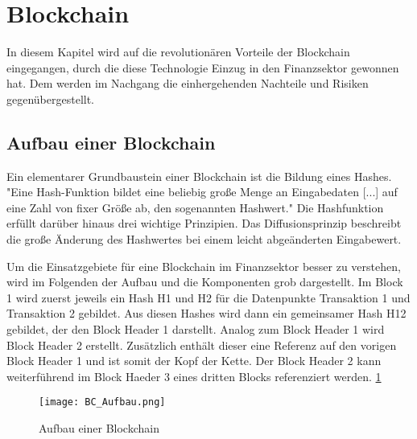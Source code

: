 \section{Blockchain}
In diesem Kapitel wird auf die revolutionären Vorteile der Blockchain 
eingegangen, durch die diese Technologie Einzug in den Finanzsektor gewonnen 
hat. Dem werden im Nachgang die einhergehenden Nachteile und Risiken gegenübergestellt. 

\subsection{Aufbau einer Blockchain}
Ein elementarer Grundbaustein einer Blockchain ist die Bildung eines Hashes.
"Eine Hash-Funktion bildet eine beliebig große Menge an Eingabedaten [...] auf eine Zahl von 
fixer Größe ab, den sogenannten Hashwert." \cite[p.~6]{fill2020aufbau}
Die Hashfunktion erfüllt darüber hinaus drei wichtige Prinzipien.
Das Diffusionsprinzip beschreibt die große Änderung des Hashwertes bei einem leicht
abgeänderten Eingabewert.
\cite[p.~6ff]{fill2020aufbau}

Um die Einsatzgebiete für eine Blockchain im Finanzsektor besser zu verstehen,
wird im Folgenden der Aufbau und die Komponenten grob dargestellt.
Im Block 1 wird zuerst jeweils ein Hash H1 und H2 für die Datenpunkte Transaktion 1 
und Transaktion 2 gebildet. Aus diesen Hashes wird dann ein gemeinsamer Hash H12 gebildet, 
der den Block Header 1 darstellt.
Analog zum Block Header 1 wird Block Header 2 erstellt. Zusätzlich enthält dieser eine
Referenz auf den vorigen Block Header 1 und ist somit der Kopf der Kette. Der Block Header 2
kann weiterführend im Block Haeder 3 eines dritten Blocks referenziert werden. 
\ref{fig:BC_Aufbau}
\cite[p.~17f]{fill2020aufbau}

\begin{figure}[h] %
    \texttt{[image: BC\_Aufbau.png]}
    \caption{Aufbau einer Blockchain}
    \label{fig:BC_Aufbau}
\end{figure}


\subsection{}